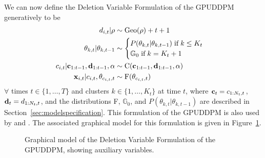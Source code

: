 \documentclass[twocolumn, final]{svjour3}
\begin{document}
We can now define the Deletion Variable Formulation of the GPUDDPM generatively to be
\begin{align}
\begin{split}
d_{i,t} | \rho  &\sim \text{Geo}(\rho) + t + 1 \\
\theta_{k, t} | \theta_{k, t-1}  &\sim
\begin{cases}
P(\theta_{k,t} | \theta_{k,t-1}) \hspace{1mm} \text{if} \hspace{1mm} k \leq K_{t} \\ %
\mathbb{G}_{0} \hspace{1mm} \text{if} \hspace{1mm} k = K_{t} + 1
\end{cases} \\
c_{i,t} | \bold{c}_{1:t-1}, \bold{d}_{1:t-1}, \alpha  &\sim  \text{C}(\bold{c}_{1:t-1}, \bold{d}_{1:t-1}, \alpha) \\
\bold{x}_{i,t} | c_{i,t}, \theta_{c_{i,t},t}  &\sim  \text{F}(\theta_{c_{i,t}, t})
\end{split}
\end{align}
$\forall$ times $t \in \{1, \ldots, T\}$ and clusters $k \in \{ 1, \ldots, K_{t} \} $ at time $t$,
where $\bold{c}_{t} = c_{1:N_{t},t}$, $\bold{d}_{t} = d_{1:N_{t},t}$, and the distributions F, $\mathbb{G}_{0}$, and $P(\theta_{k, t} | \theta_{k, t-1})$ are described in Section~\ref{sec:modelspecification}. This formulation of the GPUDDPM is also used by \cite{gasthaus_thesis} and \cite{caron_2007}. The associated graphical model for this formulation is given in Figure~\ref{fig:gpuddpm_gm_2}.
\begin{figure}[h]
        \caption{Graphical model of the Deletion Variable Formulation of the GPUDDPM, showing auxiliary variables.}
        \label{fig:gpuddpm_gm_2}
\end{figure}
\end{document}
